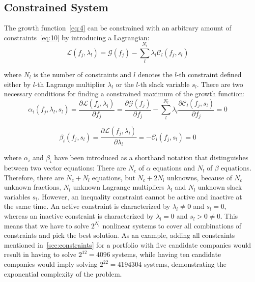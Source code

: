 \documentclass{article}
\begin{document}
\subsection{Constrained System}
\label{sec:constrainedSystem}

\noindent The growth function~\eqref{eq:4} can be constrained with an arbitrary
amount of constraints~\eqref{eq:10} by introducing a Lagrangian:
\begin{equation}
\label{eq:15}
    \mathcal{L}(f_j, \lambda_l)
  =
    \mathcal{G}(f_j) - \sum_l^{N_l} \lambda_l \mathcal{C}_l(f_j, s_l)
\end{equation}

\noindent where $N_l$ is the number of constraints and $l$ denotes the $l$-th
constraint defined either by $l$-th Lagrange multiplier $\lambda_l$ or the
$l$-th slack variable $s_l$. There are two necessary conditions for finding a
constrained maximum of the growth function:
\begin{equation}
\label{eq:16}
    \alpha_i(f_j, \lambda_l, s_l)
  =
    \frac{\partial \mathcal{L}(f_j, \lambda_l)}{\partial f_j}
  =
    \frac{\partial \mathcal{G}(f_j)}{\partial f_j}
  - \sum_l^{N_l} \lambda_l \frac{\partial{\mathcal{C}_l(f_j, s_l)}}{\partial f_j}
  =
    0
\end{equation}

\begin{equation}
\label{eq:17}
    \beta_i(f_j, s_l)
  =
    \frac{\partial \mathcal{L}(f_j, \lambda_l)}{\partial \lambda_l}
  =
    - \mathcal{C}_l(f_j, s_l)
  =
    0
\end{equation}

\noindent where $\alpha_i$ and $\beta_i$ have been introduced as a shorthand
notation that distinguishes between two vector equations: There are $N_c$
of $\alpha$ equations and $N_l$ of $\beta$ equations. Therefore, there are
$N_c + N_l$ equations, but $N_c + 2N_l$ unknowns, because of $N_c$ unknown
fractions, $N_l$ unknown Lagrange multipliers $\lambda_l$ and $N_l$ unknown
slack variables $s_l$. However, an inequality constraint cannot be active and
inactive at the same time. An active constraint is characterized by $\lambda_l
\neq 0$ and $s_l = 0$, whereas an inactive constraint is characterized by
$\lambda_l = 0$ and $s_l > 0 \ne 0$. This means that we have to solve $2^{N_l}$
nonlinear systems to cover all combinations of constraints and pick the best
solution. As an example, adding all constraints mentioned
in~\autoref{sec:constraints} for a portfolio with five candidate companies would
result in having to solve $2^{12} = 4 096$ systems, while having ten candidate
companies would imply solving $2^{22} = 4 194 304$ systems, demonstrating the
exponential complexity of the problem.
\end{document}
